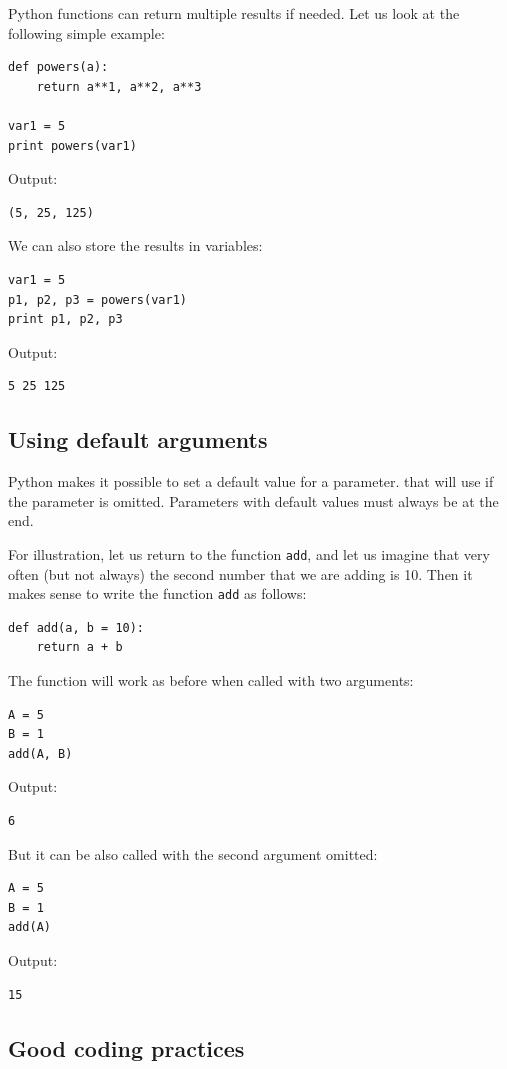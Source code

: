 Python functions can return multiple results if needed.
Let us look at the following simple example:

\begin{verbatim}
def powers(a):
    return a**1, a**2, a**3

var1 = 5
print powers(var1)
\end{verbatim}
Output:

\begin{verbatim}
(5, 25, 125)
\end{verbatim}
We can also store the results in variables:

\begin{verbatim}
var1 = 5
p1, p2, p3 = powers(var1)
print p1, p2, p3
\end{verbatim}
Output:

\begin{verbatim}
5 25 125
\end{verbatim}

\subsection{Using default arguments}

Python makes it possible to set a default value for a parameter.
that will use if the parameter is omitted. Parameters with 
default values must always be at the end. 

For illustration, let us return to the function {\tt add}, and let us 
imagine that very often (but not always) the second number that we
are adding is 10. Then it makes sense to write the function {\tt add}
as follows:

\begin{verbatim}
def add(a, b = 10):
    return a + b
\end{verbatim}
The function will work as before when called with two arguments: 

\begin{verbatim}
A = 5
B = 1
add(A, B)
\end{verbatim}
Output:
\begin{verbatim}
6
\end{verbatim}
But it can be also called with the second argument omitted:
\begin{verbatim}
A = 5
B = 1
add(A)
\end{verbatim}
Output:
\begin{verbatim}
15
\end{verbatim}

\subsection{Good coding practices}

